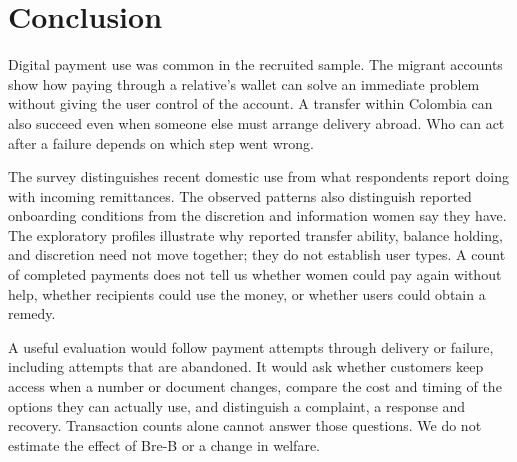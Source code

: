 \section{Conclusion}
Digital payment use was common in the recruited sample. The migrant accounts show how paying through a relative's wallet can solve an immediate problem without giving the user control of the account. A transfer within Colombia can also succeed even when someone else must arrange delivery abroad. Who can act after a failure depends on which step went wrong.

The survey distinguishes recent domestic use from what respondents report doing with incoming remittances. The observed patterns also distinguish reported onboarding conditions from the discretion and information women say they have. The exploratory profiles illustrate why reported transfer ability, balance holding, and discretion need not move together; they do not establish user types. A count of completed payments does not tell us whether women could pay again without help, whether recipients could use the money, or whether users could obtain a remedy.

A useful evaluation would follow payment attempts through delivery or failure, including attempts that are abandoned. It would ask whether customers keep access when a number or document changes, compare the cost and timing of the options they can actually use, and distinguish a complaint, a response and recovery. Transaction counts alone cannot answer those questions. We do not estimate the effect of Bre-B or a change in welfare.
